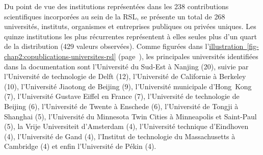 \begin{refsegment}
Du point de vue des institutions représentées dans les 238 contributions scientifiques incorporées au sein de la \acrshort{RSL}, se présente un total de 268 universités, instituts, organismes et entreprises publiques ou privées uniques. Les quinze institutions les plus récurrentes représentent à elles seules plus d'un quart de la distribution (429 valeurs observées). Comme figurées dans l'\hyperref[fig-chap2:copublications-universites-rsl]{illustration~\ref{fig-chap2:copublications-universites-rsl}} (page~\pageref{fig-chap2:copublications-universites-rsl}), les principales universités identifiées dans la documentation sont l'Université du Sud-Est à Nanjing (20), suivie par l'Université de technologie de Delft (12), l'Université de Californie à Berkeley (10), l'Université Jiaotong de Beijing (9), l'Université municipale d'Hong~Kong (7), l'Université Gustave Eiffel en France (7), l'Université de technologie de Beijing (6), l'Université de Twente à Enschede (6), l'Université de Tongji à Shanghai (5), l'Université du Minnesota Twin Cities à Minneapolis et Saint-Paul (5), la Vrije Universiteit d'Amsterdam (4), l'Université technique d'Eindhoven (4), l'Université de Gand (4), l'Institut de technologie du Massachusetts à Cambridge (4) et enfin l'Université de Pékin (4).%


\end{refsegment}

